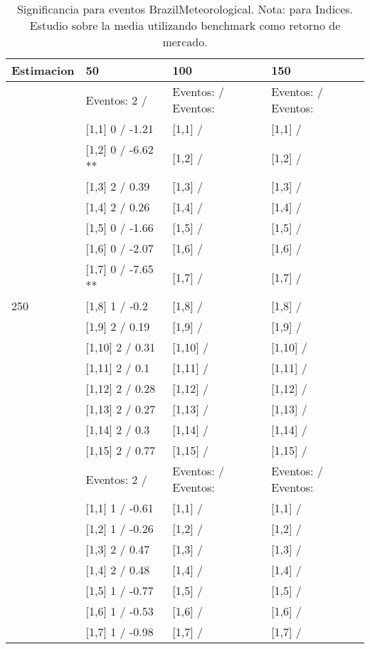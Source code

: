 \begin{table}

\caption{Significancia para eventos BrazilMeteorological. Nota: para Indices. Estudio sobre la media utilizando benchmark como retorno de mercado.}
\centering
\begin{tabular}[t]{llll}
\toprule
Estimacion & 50 & 100 & 150\\
\midrule
 & Eventos:  2 / & Eventos:   / Eventos: & Eventos:   / Eventos:\\
 & {}[1,1] 0  / -1.21 & {}[1,1]  / & {}[1,1]  /\\
 & {}[1,2] 0  / -6.62 ** & {}[1,2]  / & {}[1,2]  /\\
 & {}[1,3] 2  / 0.39 & {}[1,3]  / & {}[1,3]  /\\
 & {}[1,4] 2  / 0.26 & {}[1,4]  / & {}[1,4]  /\\
\addlinespace
 & {}[1,5] 0  / -1.66 & {}[1,5]  / & {}[1,5]  /\\
 & {}[1,6] 0  / -2.07 & {}[1,6]  / & {}[1,6]  /\\
 & {}[1,7] 0  / -7.65 ** & {}[1,7]  / & {}[1,7]  /\\
250 & {}[1,8] 1  / -0.2 & {}[1,8]  / & {}[1,8]  /\\
 & {}[1,9] 2  / 0.19 & {}[1,9]  / & {}[1,9]  /\\
\addlinespace
 & {}[1,10] 2  / 0.31 & {}[1,10]  / & {}[1,10]  /\\
 & {}[1,11] 2  / 0.1 & {}[1,11]  / & {}[1,11]  /\\
 & {}[1,12] 2  / 0.28 & {}[1,12]  / & {}[1,12]  /\\
 & {}[1,13] 2  / 0.27 & {}[1,13]  / & {}[1,13]  /\\
 & {}[1,14] 2  / 0.3 & {}[1,14]  / & {}[1,14]  /\\
\addlinespace
 & {}[1,15] 2  / 0.77 & {}[1,15]  / & {}[1,15]  /\\
 & Eventos:  2 / & Eventos:   / Eventos: & Eventos:   / Eventos:\\
 & {}[1,1] 1  / -0.61 & {}[1,1]  / & {}[1,1]  /\\
 & {}[1,2] 1  / -0.26 & {}[1,2]  / & {}[1,2]  /\\
 & {}[1,3] 2  / 0.47 & {}[1,3]  / & {}[1,3]  /\\
\addlinespace
 & {}[1,4] 2  / 0.48 & {}[1,4]  / & {}[1,4]  /\\
 & {}[1,5] 1  / -0.77 & {}[1,5]  / & {}[1,5]  /\\
 & {}[1,6] 1  / -0.53 & {}[1,6]  / & {}[1,6]  /\\
 & {}[1,7] 1  / -0.98 & {}[1,7]  / & {}[1,7]  /\\

\end{tabular}
\end{table}
